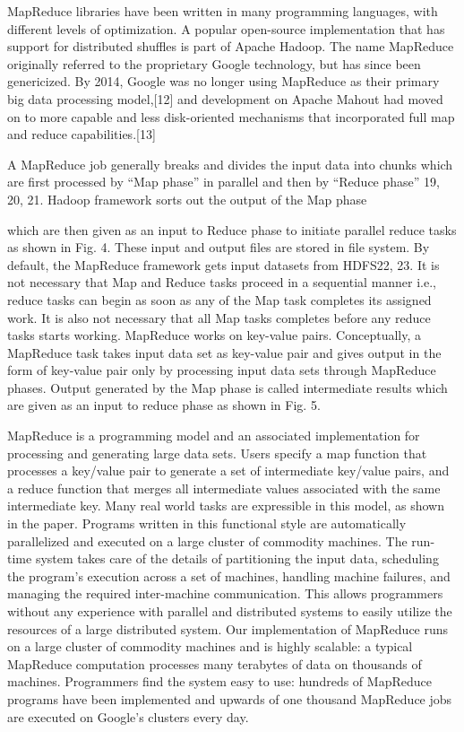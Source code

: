 \documentclass[11pt]{book}
\begin{document}
MapReduce libraries have been written in many programming languages, with different levels of optimization. A popular open-source implementation that has support for distributed shuffles is part of Apache Hadoop. The name MapReduce originally referred to the proprietary Google technology, but has since been genericized. By 2014, Google was no longer using MapReduce as their primary big data processing model,[12] and development on Apache Mahout had moved on to more capable and less disk-oriented mechanisms that incorporated full map and reduce capabilities.[13]



A MapReduce job generally breaks and divides the input data into chunks which are first processed by “Map
phase” in parallel and then by “Reduce phase” 19, 20, 21. Hadoop framework sorts out the output of the Map phase 

which are then given as an input to Reduce phase to initiate parallel reduce tasks as shown in Fig. 4. These input and
output files are stored in file system. By default, the MapReduce framework gets input datasets from HDFS22, 23. It is
not necessary that Map and Reduce tasks proceed in a sequential manner i.e., reduce tasks can begin as soon as any
of the Map task completes its assigned work. It is also not necessary that all Map tasks completes before any reduce
tasks starts working. MapReduce works on key-value pairs. Conceptually, a MapReduce task takes input data set as
key-value pair and gives output in the form of key-value pair only by processing input data sets through MapReduce
phases. Output generated by the Map phase is called intermediate results which are given as an input to reduce phase
as shown in Fig. 5.


MapReduce is a programming model and an associated implementation for processing and generating large
data sets. Users specify a map function that processes a
key/value pair to generate a set of intermediate key/value
pairs, and a reduce function that merges all intermediate
values associated with the same intermediate key. Many
real world tasks are expressible in this model, as shown
in the paper.
Programs written in this functional style are automatically parallelized and executed on a large cluster of commodity machines. The run-time system takes care of the
details of partitioning the input data, scheduling the program’s execution across a set of machines, handling machine failures, and managing the required inter-machine
communication. This allows programmers without any
experience with parallel and distributed systems to easily utilize the resources of a large distributed system.
Our implementation of MapReduce runs on a large
cluster of commodity machines and is highly scalable:
a typical MapReduce computation processes many terabytes of data on thousands of machines. Programmers
find the system easy to use: hundreds of MapReduce programs have been implemented and upwards of one thousand MapReduce jobs are executed on Google’s clusters
every day.
\end{document}
